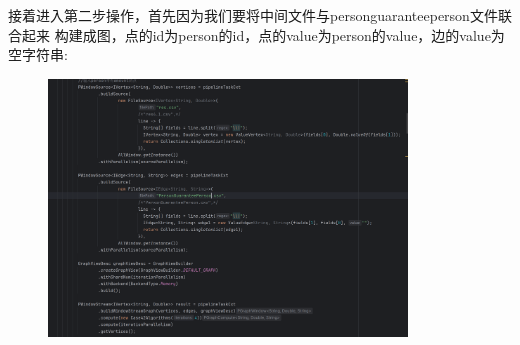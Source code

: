 接着进入第二步操作，首先因为我们要将中间文件与personguaranteeperson文件联合起来
构建成图，点的id为person的id，点的value为person的value，边的value为空字符串:
\begin{figure}[H]
  \begin{center}
    \includegraphics[width=0.85\textwidth,scale=0.7]{./figures/pro3/4.png}
  \end{center}
\end{figure}

